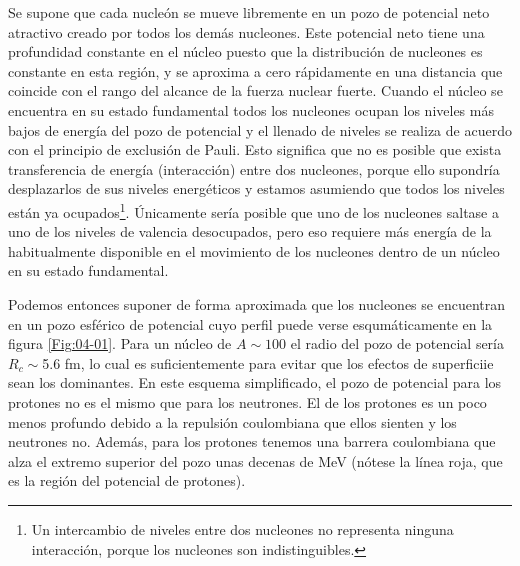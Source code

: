 Se supone que cada nucleón se mueve libremente en un pozo de potencial neto atractivo creado por todos los demás nucleones. Este potencial neto tiene una profundidad constante en el núcleo puesto que la distribución de nucleones es constante en esta región, y se aproxima a cero rápidamente en una distancia que coincide con el rango del alcance de la fuerza nuclear fuerte. Cuando el núcleo se encuentra en su estado fundamental todos los nucleones ocupan los niveles más bajos de energía del pozo de potencial y el llenado de niveles se realiza de acuerdo con el principio de exclusión de Pauli. Esto significa que no es posible que exista transferencia de energía (interacción) entre dos nucleones, porque ello supondría desplazarlos de sus niveles energéticos y estamos asumiendo que todos los niveles están ya ocupados\footnote{Un intercambio de niveles entre dos nucleones no representa ninguna interacción, porque los nucleones son indistinguibles.}. Únicamente sería posible que uno de los nucleones saltase a uno de los niveles de valencia desocupados, pero eso requiere más energía de la habitualmente disponible en el movimiento de los nucleones dentro de un núcleo en su estado fundamental.


Podemos entonces suponer de forma aproximada que los nucleones se encuentran en un pozo esférico de potencial cuyo perfil puede verse esqumáticamente en la figura \ref{Fig:04-01}. Para un núcleo de $A \sim 100$ el radio del pozo de potencial sería $R_c \sim$5.6 fm, lo cual es suficientemente para evitar que los efectos de superficiie sean los dominantes. En este esquema simplificado, el pozo de potencial para los protones no es el mismo que para los neutrones. El de los protones es un poco menos profundo debido a la repulsión coulombiana que ellos sienten y los neutrones no. Además, para los protones tenemos una barrera coulombiana que alza el extremo superior del pozo unas decenas de MeV (nótese la línea roja, que es la región del potencial de protones).

